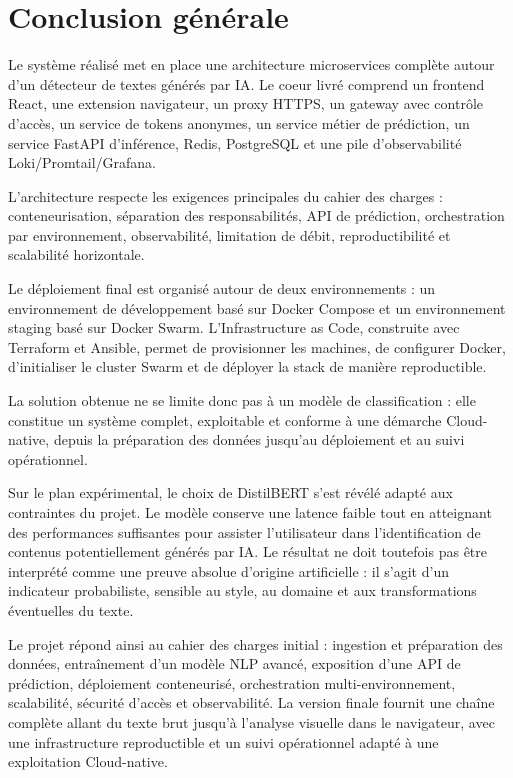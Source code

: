 ﻿\documentclass[12pt, a4paper]{report}
\begin{document}

\chapter{Conclusion générale}

Le système réalisé met en place une architecture microservices complète autour
d'un détecteur de textes générés par IA. Le coeur livré comprend un frontend
React, une extension navigateur, un proxy HTTPS, un gateway avec contrôle
d'accès, un service de tokens anonymes, un service métier de prédiction, un
service FastAPI d'inférence, Redis, PostgreSQL et une pile d'observabilité
Loki/Promtail/Grafana.

L'architecture respecte les exigences principales du cahier des charges :
conteneurisation, séparation des responsabilités, API de prédiction,
orchestration par environnement, observabilité, limitation de débit,
reproductibilité et scalabilité horizontale.

Le déploiement final est organisé autour de deux environnements : un
environnement de développement basé sur Docker Compose et un environnement
staging basé sur Docker Swarm. L'Infrastructure as Code, construite avec
Terraform et Ansible, permet de provisionner les machines, de configurer Docker,
d'initialiser le cluster Swarm et de déployer la stack de manière reproductible.

La solution obtenue ne se limite donc pas à un modèle de classification : elle
constitue un système complet, exploitable et conforme à une démarche
Cloud-native, depuis la préparation des données jusqu'au déploiement et au suivi
opérationnel.

Sur le plan expérimental, le choix de DistilBERT s'est révélé adapté aux
contraintes du projet. Le modèle conserve une latence faible tout en atteignant
des performances suffisantes pour assister l'utilisateur dans l'identification
de contenus potentiellement générés par IA. Le résultat ne doit toutefois pas
être interprété comme une preuve absolue d'origine artificielle : il s'agit d'un
indicateur probabiliste, sensible au style, au domaine et aux transformations
éventuelles du texte.

Le projet répond ainsi au cahier des charges initial : ingestion et préparation
des données, entraînement d'un modèle NLP avancé, exposition d'une API de
prédiction, déploiement conteneurisé, orchestration multi-environnement,
scalabilité, sécurité d'accès et observabilité. La version finale fournit une
chaîne complète allant du texte brut jusqu'à l'analyse visuelle dans le
navigateur, avec une infrastructure reproductible et un suivi opérationnel
adapté à une exploitation Cloud-native.
\end{document}
